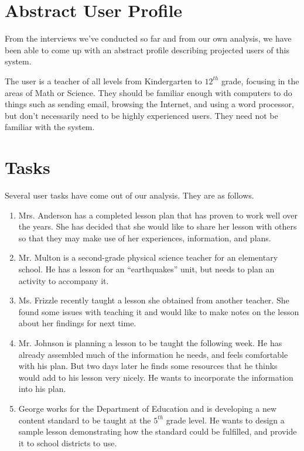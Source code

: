 \documentclass[12pt,titlepage]{article}
\begin{document}
\section{Abstract User Profile}
From the interviews we've conducted so far and from our own analysis, we have
been able to come up with an abstract profile describing projected users of this
system.

The user is a teacher of all levels from Kindergarten to $12^{th}$ grade,
focusing in the areas of Math or Science. They should be familiar enough with
computers to do things such as sending email, browsing the Internet, and using a
word processor, but don't necessarily need to be highly experienced users. They
need not be familiar with the system.

\section{Tasks}
Several user tasks have come out of our analysis.  They are as follows.

\begin{enumerate}
\item Mrs. Anderson has a completed lesson plan that has proven to work well over
      the years.  She has decided that she would like to share her lesson with
      others so that they may make use of her experiences, information, and
      plans.

\item Mr. Multon is a second-grade physical science teacher for an elementary school.
      He has a lesson for an ``earthquakes'' unit, but needs to plan an activity
      to accompany it.

\item Ms. Frizzle recently taught a lesson she obtained from another teacher.  She
      found some issues with teaching it and would like to make notes on the lesson
      about her findings for next time.

\item Mr. Johnson is planning a lesson to be taught the following week.  He has
      already assembled much of the information he needs, and feels comfortable
      with his plan.  But two days later he finds some resources that he thinks
      would add to his lesson very nicely.  He wants to incorporate the information
      into his plan.

\item George works for the Department of Education and is developing a new content
      standard to be taught at the $5^{th}$ grade level.  He wants to design a
      sample lesson demonstrating how the standard could be fulfilled, and provide
      it to school districts to use.
\end{enumerate}
\end{document}
